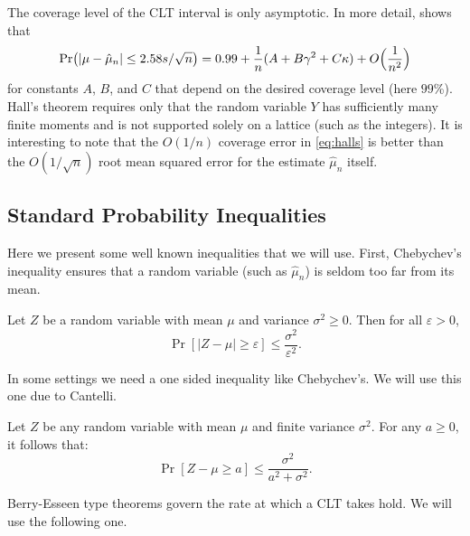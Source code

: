 \documentclass[graybox]{svmult}
\newcommand{\Prob}{\Pr}
\newcommand{\abs}[1]{\left|#1\right|}
\def\abs#1{\ensuremath{\left \lvert #1 \right \rvert}}
\begin{document}
The coverage level of the CLT interval is only asymptotic. In
more detail, \cite[p.\ 948]{Hal88a} shows that
\begin{align}\label{eq:halls}
\Pr\bigl(
\abs{\mu - 
\hat\mu_n} \le 2.58 s/\sqrt{n}
\bigr)
= 0.99 + \frac1n(A + B\gamma^2+C\kappa) + O\Bigl(\frac1{n^2}\Bigr)
\end{align}
for constants $A$, $B$, and $C$ that depend
on the desired coverage level (here $99$\%).  Hall's theorem
requires only that the random variable $Y$ has sufficiently
many finite moments
and is not supported solely on a lattice (such as
the integers).
It is interesting to note that the $O(1/n)$ coverage error in
\eqref{eq:halls} is better than the $O(1/\sqrt{n})$
root mean squared error for the estimate $\hat\mu_n$ itself.


\subsection{Standard Probability Inequalities}

Here we present some well known inequalities
that we will use.
First, Chebychev's inequality ensures that
a random variable (such as $\hat\mu_n$) is
seldom too far from its mean.

\begin{theorem} \citep[6.1c, p.\ 52]{LinBai10a}\label{Chebineqthm} Let $Z$ be a random variable with mean $\mu$ and variance $\sigma^2 \ge 0$.  
Then for all $\varepsilon >0$,
\[
\Prob[\abs{Z-\mu} \ge \varepsilon ] \le \frac{\sigma^2}{\varepsilon^2}.
\]
\end{theorem}


In some settings we need a one sided inequality
like Chebychev's. We will use this one due to Cantelli.

\begin{theorem} \citep[6.1e, p.\ 53]{LinBai10a} \label{Can}
Let $Z$ be any random variable with mean $\mu$ and finite variance $\sigma^2$.  For any $a\geq 0$, it
follows that:
\[
\Prob[Z-\mu \geq a]\leq \frac{\sigma^2}{a^2+\sigma^2}.
\]
\end{theorem}

Berry-Esseen type theorems govern the rate at which
a CLT takes hold. We will use the following one.
\end{document}
